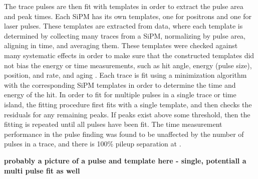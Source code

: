 The trace pulses are then fit with templates in order to extract the pulse area and peak times. Each SiPM has its own templates, one for positrons and one for laser pulses. These templates are extracted from data, where each template is determined by collecting many traces from a SiPM, normalizing by pulse area, aligning in time, and averaging them. These templates were checked against many systematic effects in order to make sure that the constructed templates did not bias the energy or time measurements, such as hit angle, energy (pulse size), position, and rate, and aging \cite{Kaspar:2016ofv,AFThesis}. Each trace is fit using a \chisq minimization algorithm with the corresponding SiPM templates in order to determine the time and energy of the hit. In order to fit for multiple pulses in a single trace or time island, the fitting procedure first fits with a single template, and then checks the residuals for any remaining peaks. If peaks exist above some threshold, then the fitting is repeated until all pulses have been fit. The time measurement performance in the pulse finding was found to be unaffected by the number of pulses in a trace, and there is 100\% pileup separation at  \cite{AFThesis}. 



\textbf{probably a picture of a pulse and template here - single, potentiall a multi pulse fit as well}



